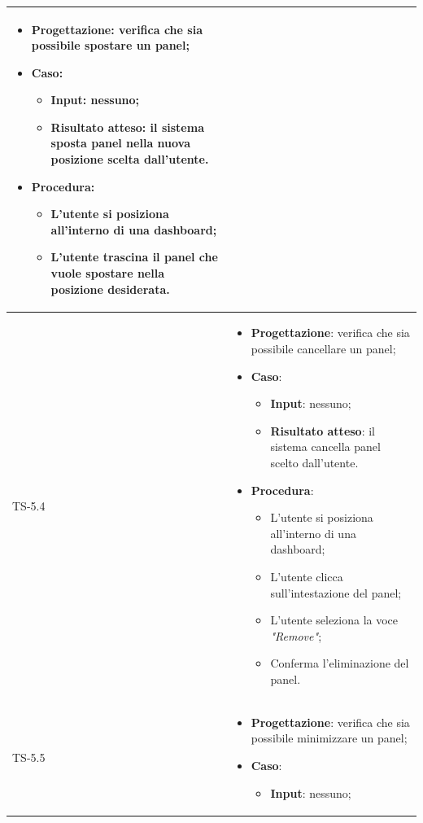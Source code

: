 \begin{longtable}{|C{2.5cm}|C{13cm}|}
\begin{itemize}
	\item \textbf{Progettazione}: verifica che sia possibile spostare un panel;
	\item \textbf{Caso}: 
	\begin{itemize}
		\item \textbf{Input}: nessuno;
		\item \textbf{Risultato atteso}: il sistema sposta panel nella nuova posizione scelta dall'utente.
	\end{itemize}
	\item \textbf{Procedura}:
	\begin{itemize}
		\item L'utente si posiziona all'interno di una dashboard;
		\item L'utente trascina il panel che vuole spostare nella posizione desiderata.
	\end{itemize} 
\end{itemize}
	 \\
	\hline
	{TS-5.4} & 
\begin{itemize}
	\item \textbf{Progettazione}: verifica che sia possibile cancellare un
	panel;
	\item \textbf{Caso}: 
	\begin{itemize}
		\item \textbf{Input}: nessuno;
		\item \textbf{Risultato atteso}: il sistema cancella panel scelto dall'utente.
	\end{itemize}
	\item \textbf{Procedura}:
	\begin{itemize}
		\item L'utente si posiziona all'interno di una dashboard;
		\item L'utente clicca sull'intestazione del panel;
		\item L'utente seleziona la voce \emph{"Remove"};
		\item Conferma l'eliminazione del panel.
	\end{itemize} 
\end{itemize}
	 \\
	\hline
	{TS-5.5} & 
\begin{itemize}
	\item \textbf{Progettazione}: verifica che sia possibile minimizzare un
	panel;
	\item \textbf{Caso}: 
	\begin{itemize}
		\item \textbf{Input}: nessuno;

\end{itemize}
\end{itemize}
\end{longtable}
